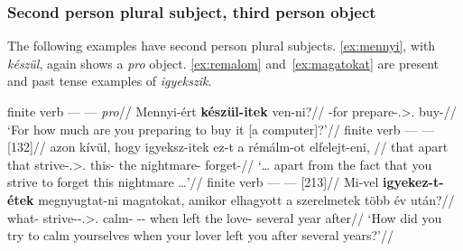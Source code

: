 \subsubsection{Second person plural subject, third person object}\label{sub:2pl-3}

The following examples have second person plural subjects. \eqref{ex:mennyi},
with \emph{készül}, again shows a \emph{pro} object. \eqref{ex:remalom}
and~\eqref{ex:magatokat} are present and past tense examples of
\emph{igyekszik}.

\ex\label{ex:mennyi}%
    \begingl
        \glpreamble finite verb --- \Inf{} --- \emph{pro}//
        \gla 	Mennyi-ért \textbf{készül-itek} ven-ni?//
        -for prepare-\Spl.\Sbj>\Third.\Obj{} buy-\Inf{}//
        \glft 	\enquote*{For how much are you preparing to buy it [a computer]?}\trailingcitation{}//
    \endgl
\xe
\ex\label{ex:remalom}%
    \begingl
        \glpreamble finite verb --- \Obj{} --- \Inf{} [132]//
        \gla 	\nogloss{\dots} azon kívül, hogy igyeksz-itek ez-t a rémálm-ot elfelejt-eni, \nogloss{\dots}//
        \glb 	that apart that strive-\Spl.\Sbj>\Third.\Obj{} this-\Acc{} the nightmare-\Acc{} forget-\Inf//
        \glft 	\enquote*{\dots{} apart from the fact that you strive to forget this nightmare \dots{}}\trailingcitation{}//
    \endgl
\xe
\ex\label{ex:magatokat}%
    \begingl
        \glpreamble finite verb --- \Inf{} --- \Obj{} [213]//
        \gla 	Mi-vel \textbf{igyekez-t-étek} megnyugtat-ni magatokat, amikor elhagyott a szerelmetek több év után?//
        \glb 	what-\Com{} strive-\Pst-\Tsg.\Sbj>\Third.\Obj{} calm-\Inf{} \Refl-\Tpl-\Acc{} when left the love-\Tpl{} several year after//
        \glft 	\enquote*{How did you try to calm yourselves when your lover left you after several years?}\trailingcitation{}//
    \endgl
\xe

